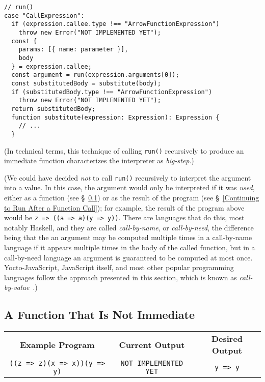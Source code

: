 \documentclass[12pt, oneside]{book}
\begin{document}
\begin{verbatim}
// run()
case "CallExpression":
  if (expression.callee.type !== "ArrowFunctionExpression")
    throw new Error("NOT IMPLEMENTED YET");
  const {
    params: [{ name: parameter }],
    body
  } = expression.callee;
  const argument = run(expression.arguments[0]);
  const substitutedBody = substitute(body);
  if (substitutedBody.type !== "ArrowFunctionExpression")
    throw new Error("NOT IMPLEMENTED YET");
  return substitutedBody;
  function substitute(expression: Expression): Expression {
    // ...
  }
\end{verbatim}

(In technical terms, this technique of calling \texttt{run()} recursively to produce an immediate function characterizes the interpreter as \emph{big-step}.)

(We could have decided \emph{not} to call \texttt{run()} recursively to interpret the argument into a value. In this case, the argument would only be interpreted if it was \emph{used}, either as a function (see §~\ref{A Function That Is Not Immediate}) or as the result of the program (see §~\ref{Continuing to Run After a Function Call}); for example, the result of the program above would be \texttt{z => ((a => a)(y => y))}. There are languages that do this, most notably Haskell, and they are called \emph{call-by-name}, or \emph{call-by-need}, the difference being that the an argument may be computed multiple times in a call-by-name language if it appears multiple times in the body of the called function, but in a call-by-need language an argument is guaranteed to be computed at most once. Yocto-JavaScript, JavaScript itself, and most other popular programming languages follow the approach presented in this section, which is known as \emph{call-by-value}~\cite{call-by-name-call-by-value-and-the-lambda-calculus}.)

\subsection{A Function That Is Not Immediate}
\label{A Function That Is Not Immediate}

\begin{center}
\begin{tabular}{c|c|c}
\textbf{Example Program} & \textbf{Current Output} & \textbf{Desired Output} \\
\texttt{((z => z)(x => x))(y => y)} & \texttt{NOT IMPLEMENTED YET} & \texttt{y => y} \\
\end{tabular}
\end{center}
\end{document}
